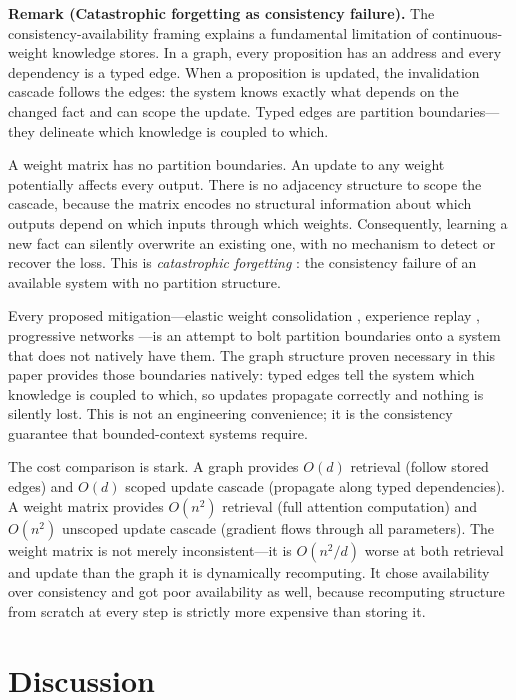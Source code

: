 \documentclass[11pt]{article}
\theoremstyle{definition}
\begin{document}
\textbf{Remark (Catastrophic forgetting as consistency failure).}
The consistency-availability framing explains a fundamental limitation
of continuous-weight knowledge stores. In a graph, every proposition
has an address and every dependency is a typed edge. When a proposition
is updated, the invalidation cascade follows the edges: the system
knows exactly what depends on the changed fact and can scope the
update. Typed edges are partition boundaries---they delineate which
knowledge is coupled to which.

A weight matrix has no partition boundaries. An update to any weight
potentially affects every output. There is no adjacency structure to
scope the cascade, because the matrix encodes no structural information
about which outputs depend on which inputs through which weights.
Consequently, learning a new fact can silently overwrite an existing
one, with no mechanism to detect or recover the loss. This is
\emph{catastrophic forgetting} \cite{McCloskey1989, Kirkpatrick2017}:
the consistency failure of an available system with no partition
structure.

Every proposed mitigation---elastic weight consolidation
\cite{Kirkpatrick2017}, experience replay \cite{Rolnick2019},
progressive networks \cite{Rusu2016}---is an attempt to bolt partition
boundaries onto a system that does not natively have them.
The graph structure proven necessary in this paper provides those
boundaries natively: typed edges tell the system which knowledge
is coupled to which, so updates propagate correctly and nothing is
silently lost. This is not an engineering convenience; it is the
consistency guarantee that bounded-context systems require.

The cost comparison is stark. A graph provides $O(d)$ retrieval
(follow stored edges) and $O(d)$ scoped update cascade (propagate
along typed dependencies). A weight matrix provides $O(n^2)$
retrieval (full attention computation) and $O(n^2)$ unscoped update
cascade (gradient flows through all parameters). The weight matrix
is not merely inconsistent---it is $O(n^2/d)$ worse at both
retrieval and update than the graph it is dynamically recomputing.
It chose availability over consistency and got poor availability as
well, because recomputing structure from scratch at every step is
strictly more expensive than storing it.

\section{Discussion}
\label{sec:discussion}
\end{document}
